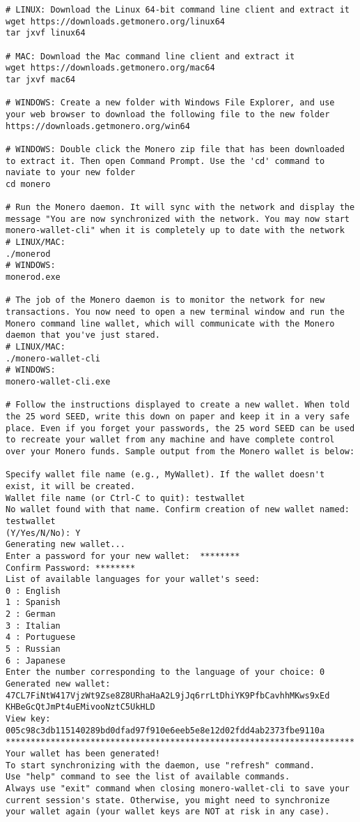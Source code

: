\begin{lstlisting}[mathescape]
# LINUX: Download the Linux 64-bit command line client and extract it
wget https://downloads.getmonero.org/linux64
tar jxvf linux64

# MAC: Download the Mac command line client and extract it
wget https://downloads.getmonero.org/mac64
tar jxvf mac64

# WINDOWS: Create a new folder with Windows File Explorer, and use your web browser to download the following file to the new folder
https://downloads.getmonero.org/win64

# WINDOWS: Double click the Monero zip file that has been downloaded to extract it. Then open Command Prompt. Use the 'cd' command to naviate to your new folder
cd monero

# Run the Monero daemon. It will sync with the network and display the message "You are now synchronized with the network. You may now start monero-wallet-cli" when it is completely up to date with the network
# LINUX/MAC:
./monerod
# WINDOWS:
monerod.exe

# The job of the Monero daemon is to monitor the network for new transactions. You now need to open a new terminal window and run the Monero command line wallet, which will communicate with the Monero daemon that you've just stared.
# LINUX/MAC:
./monero-wallet-cli
# WINDOWS:
monero-wallet-cli.exe

# Follow the instructions displayed to create a new wallet. When told the 25 word SEED, write this down on paper and keep it in a very safe place. Even if you forget your passwords, the 25 word SEED can be used to recreate your wallet from any machine and have complete control over your Monero funds. Sample output from the Monero wallet is below:

Specify wallet file name (e.g., MyWallet). If the wallet doesn't exist, it will be created.
Wallet file name (or Ctrl-C to quit): testwallet
No wallet found with that name. Confirm creation of new wallet named: testwallet
(Y/Yes/N/No): Y
Generating new wallet...
Enter a password for your new wallet:  ********
Confirm Password: ********
List of available languages for your wallet's seed:
0 : English
1 : Spanish
2 : German
3 : Italian
4 : Portuguese
5 : Russian
6 : Japanese
Enter the number corresponding to the language of your choice: 0
Generated new wallet: 47CL7FiNtW417VjzWt9Zse8Z8URhaHaA2L9jJq6rrLtDhiYK9PfbCavhhMKws9xEd KHBeGcQtJmPt4uEMivooNztC5UkHLD
View key: 005c98c3db115140289bd0dfad97f910e6eeb5e8e12d02fdd4ab2373fbe9110a
**********************************************************************
Your wallet has been generated!
To start synchronizing with the daemon, use "refresh" command.
Use "help" command to see the list of available commands.
Always use "exit" command when closing monero-wallet-cli to save your
current session's state. Otherwise, you might need to synchronize
your wallet again (your wallet keys are NOT at risk in any case).



\end{lstlisting}

